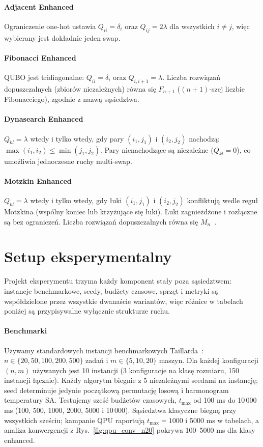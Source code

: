 \documentclass[11pt,a4paper]{article}
\begin{document}
\paragraph{Adjacent Enhanced}
Ograniczenie one-hot ustawia $Q_{ii}=\delta_i$ oraz $Q_{ij}=2\lambda$
dla wszystkich $i\neq j$, więc wybierany jest dokładnie jeden swap.

\paragraph{Fibonacci Enhanced}
QUBO jest tridiagonalne: $Q_{ii}=\delta_i$ oraz
$Q_{i,i+1}=\lambda$. Liczba rozwiązań dopuszczalnych (zbiorów
niezależnych) równa się $F_{n+1}$ ($(n{+}1)$-szej liczbie
Fibonacciego), zgodnie z nazwą sąsiedztwa.

\paragraph{Dynasearch Enhanced}
$Q_{kl}=\lambda$ wtedy i tylko wtedy, gdy pary $(i_1,j_1)$
i $(i_2,j_2)$ nachodzą: $\max(i_1,i_2)\le\min(j_1,j_2)$. Pary
nienachodzące są niezależne ($Q_{kl}=0$), co umożliwia jednoczesne
ruchy multi-swap.

\paragraph{Motzkin Enhanced}
$Q_{kl}=\lambda$ wtedy i tylko wtedy, gdy łuki $(i_1,j_1)$
i $(i_2,j_2)$ konfliktują wedle reguł Motzkina (wspólny koniec lub
krzyżujące się łuki). Łuki zagnieżdżone i rozłączne są bez ograniczeń.
Liczba rozwiązań dopuszczalnych równa się $M_n$~\citep{Motzkin_PWR}.

\section{Setup eksperymentalny}
\label{sec:setup}

Projekt eksperymentu trzyma każdy komponent stały poza sąsiedztwem:
instancje benchmarkowe, seedy, budżety czasowe, sprzęt i metryki są
współdzielone przez wszystkie dwanaście wariantów, więc różnice
w tabelach poniżej są przypisywalne wyłącznie strukturze ruchu.

\paragraph{Benchmarki}
Używamy standardowych instancji benchmarkowych
Taillarda~\citep{ref_taillard}: $n\in\{20,50,100,200,500\}$ zadań
i $m\in\{5,10,20\}$ maszyn. Dla każdej konfiguracji $(n,m)$ używanych
jest 10 instancji (3 konfiguracje na klasę rozmiaru, 150 instancji
łącznie). Każdy algorytm biegnie z 5 niezależnymi seedami na
instancję; seed determinuje jedynie początkową permutację losową
i harmonogram temperatury SA. Testujemy sześć budżetów czasowych,
$t_{\max}$ od 100 ms do 10\,000 ms (100, 500, 1000, 2000, 5000
i 10\,000). Sąsiedztwa klasyczne biegną przy wszystkich sześciu;
kampanie QPU raportują $t_{\max}=1000$ i 5000 ms w tabelach, a analiza
konwergencji z Rys.~\ref{fig:qpu_conv_n20} pokrywa 100--5000 ms dla
klasy enhanced.
\end{document}
